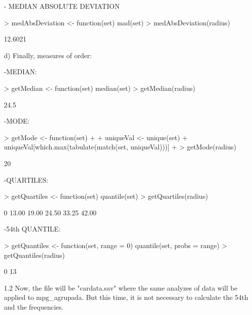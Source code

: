 \documentclass[a4paper]{article}
\begin{document}
			- MEDIAN ABSOLUTE DEVIATION
\begin{Schunk}
\begin{Sinput}
> medAbsDeviation <- function(set) {mad(set)}
> medAbsDeviation(radius)
\end{Sinput}
\begin{Soutput}
[1] 12.6021
\end{Soutput}
\end{Schunk}
		d) Finally, measures of order:
		
			-MEDIAN:
\begin{Schunk}
\begin{Sinput}
> getMedian    <- function(set) {median(set)}
> getMedian(radius)
\end{Sinput}
\begin{Soutput}
[1] 24.5
\end{Soutput}
\end{Schunk}
			-MODE:
\begin{Schunk}
\begin{Sinput}
> getMode      <- function(set) 
+ {
+     uniqueVal <- unique(set)
+     uniqueVal[which.max(tabulate(match(set, uniqueVal)))]
+ }
> getMode(radius)
\end{Sinput}
\begin{Soutput}
[1] 20
\end{Soutput}
\end{Schunk}
			-QUARTILES:
\begin{Schunk}
\begin{Sinput}
> getQuartiles <- function(set) {quantile(set)}
> getQuartiles(radius)
\end{Sinput}
\begin{Soutput}
   0%   25%   50%   75%  100% 
13.00 19.00 24.50 33.25 42.00 
\end{Soutput}
\end{Schunk}
			-54th QUANTILE:
\begin{Schunk}
\begin{Sinput}
> getQuantiles <- function(set, range = 0) {quantile(set, probs = range)}
> getQuantiles(radius)
\end{Sinput}
\begin{Soutput}
0% 
13 
\end{Soutput}
\end{Schunk}

	1.2 Now, the file will be "cardata.sav" where the same analyzes of data will be
	applied to mpg_agrupada. But this time, it is not necessary to calculate the 54th and the
	frequencies.
	
\end{document}
